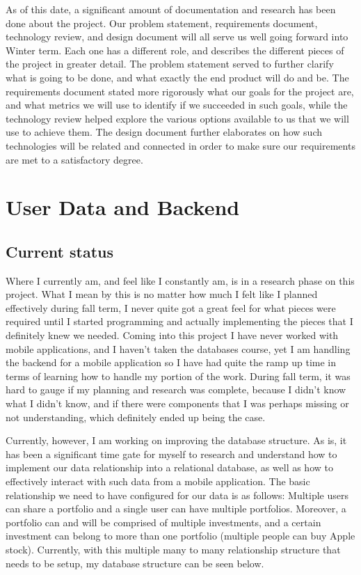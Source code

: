 \documentclass[letterpaper,10pt,titlepage,journal,compsoc,draftclsnofoot,onecolumn]{IEEEtran}
\begin{document}
As of this date, a significant amount of documentation and research has been done about the project. Our problem statement, requirements document, technology review, and design document will all serve us well going forward into Winter term. Each one has a different role, and describes the different pieces of the project in greater detail. The problem statement served to further clarify what is going to be done, and what exactly the end product will do and be. The requirements document stated more rigorously what our goals for the project are, and what metrics we will use to identify if we succeeded in such goals, while the technology review helped explore the various options available to us that we will use to achieve them. The design document further elaborates on how such technologies will be related and connected in order to make sure our requirements are met to a satisfactory degree.

\section{User Data and Backend}
\subsection{Current status}
Where I currently am, and feel like I constantly am, is in a research phase on this project. What I mean by this is no matter how much I felt like I planned effectively during fall term, I never quite got a great feel for what pieces were required until I started programming and actually implementing the pieces that I definitely knew we needed. Coming into this project I have never worked with mobile applications, and I haven’t taken the databases course, yet I am handling the backend for a mobile application so I have had quite the ramp up time in terms of learning how to handle my portion of the work. During fall term, it was hard to gauge if my planning and research was complete, because I didn’t know what I didn’t know, and if there were components that I was perhaps missing or not understanding, which definitely ended up being the case. 

Currently, however, I am working on improving the database structure. As is, it has been a significant time gate for myself to research and understand how to implement our data relationship into a relational database, as well as how to effectively interact with such data from a mobile application. The basic relationship we need to have configured for our data is as follows: Multiple users can share a portfolio and a single user can have multiple portfolios. Moreover, a portfolio can and will be comprised of multiple investments, and a certain investment can belong to more than one portfolio (multiple people can buy Apple stock). Currently, with this multiple many to many relationship structure that needs to be setup, my database structure can be seen below.
\end{document}
